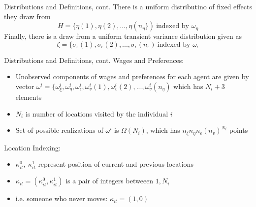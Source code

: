 \documentclass[aspectratio=169,professionalfonts]{beamer}
\begin{document}
\begin{frame}{Distributions and Definitions, cont.}
  There is a uniform distributino of fixed effects they draw from 
  \begin{equation}
    H = \{\eta(1), \eta(2), ..., \eta(n_{\eta}\}) \ \text{indexed by $\omega_{\eta}$}
  \end{equation}
  Finally, there is a draw from a uniform transient variance distribution given as
  \begin{equation}
    \zeta = \{\sigma_{\epsilon}(1), \sigma_{\epsilon}(2), ..., \sigma_{\epsilon}(n_{\epsilon}) \ \text{indexed by $\omega_{\epsilon}$}
  \end{equation}
\end{frame}

\begin{frame}{Distributions and Definitions, cont.}
  Wages and Preferences:
  \begin{itemize}
  \item Unobserved components of wages and preferences for each agent are given by vector $\omega^i = \{\omega^i_{\xi}, \omega_{\eta}^i, \omega_{\epsilon}^i, \omega_v^i(1), \omega_v^i(2), ..., \omega_v^i(n_{\eta})$ which has $N_i+3$ elements
  \item $N_i$ is number of locations visited by the individual $i$
    \item Set of possible realizations of $\omega^i$ is $\Omega(N_i)$, which has $n_{\xi}n_{\eta}n_{\epsilon}(n_v)^{N_i}$ points
  \end{itemize}
  Location Indexing:
  \begin{itemize}
    \item $\kappa_{it}^0, \ \kappa_{it}^1$ represent position of current and previous locations
    \item $\kappa_{it} = (\kappa_{it}^0, \kappa_{it}^1)$ is a pair of integers betweeen $1, N_i$
    \item i.e. someone who never moves: $\kappa_{it} = (1, 0)$
  \end{itemize}
\end{frame}
\end{document}
